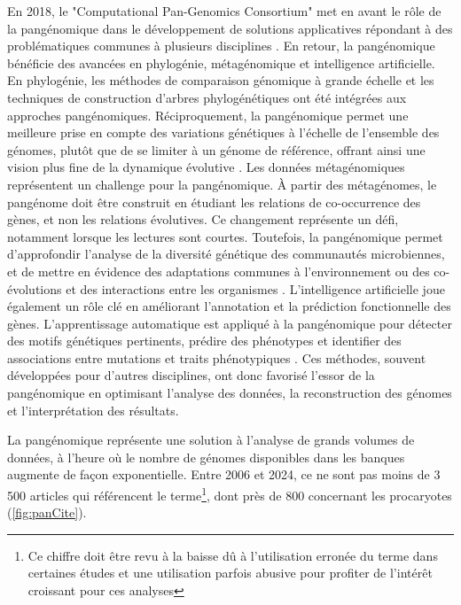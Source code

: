 En 2018, le "Computational Pan-Genomics Consortium" met en avant le rôle de la pangénomique dans le développement de solutions applicatives répondant à des problématiques communes à plusieurs disciplines \cite{the_computational_pan-genomics_consortium_computational_2018}. En retour, la pangénomique bénéficie des avancées en phylogénie, métagénomique et intelligence artificielle.
En phylogénie, les méthodes de comparaison génomique à grande échelle et les techniques de construction d'arbres phylogénétiques ont été intégrées aux approches pangénomiques. Réciproquement, la pangénomique permet une meilleure prise en compte des variations génétiques à l'échelle de l'ensemble des génomes, plutôt que de se limiter à un génome de référence, offrant ainsi une vision plus fine de la dynamique évolutive \cite{bazinet_pan-genome_2017}.
Les données métagénomiques représentent un challenge pour la pangénomique. À partir des métagénomes, le pangénome doit être construit en étudiant les relations de co-occurrence des gènes, et non les relations évolutives. Ce changement représente un défi, notamment lorsque les lectures sont courtes. Toutefois, la pangénomique permet d'approfondir l’analyse de la diversité génétique des communautés microbiennes, et de mettre en évidence des adaptations communes à l'environnement ou des co-évolutions et des interactions entre les organismes \cite{the_computational_pan-genomics_consortium_computational_2018}.
L’intelligence artificielle joue également un rôle clé en améliorant l’annotation et la prédiction fonctionnelle des gènes. L’apprentissage automatique est appliqué à la pangénomique pour détecter des motifs génétiques pertinents, prédire des phénotypes et identifier des associations entre mutations et traits phénotypiques \cite{her_pan-genome-based_2018}. Ces méthodes, souvent développées pour d’autres disciplines, ont donc favorisé l’essor de la pangénomique en optimisant l’analyse des données, la reconstruction des génomes et l’interprétation des résultats.


La pangénomique représente une solution à l'analyse de grands volumes de données, à l'heure où le nombre de génomes disponibles dans les banques augmente de façon exponentielle. Entre 2006 et 2024, ce ne sont pas moins de 3 500 articles qui référencent le terme\footnote{Ce chiffre doit être revu à la baisse dû à l'utilisation erronée du terme dans certaines études et une utilisation parfois abusive pour profiter de l'intérêt croissant pour ces analyses}, dont près de 800 concernant les procaryotes (\autoref{fig:panCite}).

